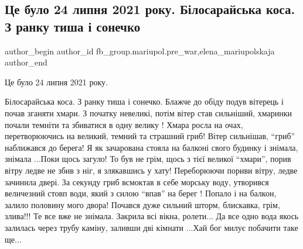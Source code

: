  
 
 
 
 

\subsection{Це було 24 липня 2021 року. Білосарайська коса. З ранку тиша і сонечко}
\label{sec:28_01_2023.fb.fb_group.mariupol.pre_war.3.tse_bulo_24_lipnya_2}
 
\ifcmt
 author_begin
   author_id fb_group.mariupol.pre_war,elena_mariupolskaja
 author_end
\fi

Це було 24 липня 2021 року.

Білосарайська коса. З ранку тиша і сонечко. Блажче до обіду подув вітерець і
почав зганяти хмари. З початку невеликі, потім вітер став сильніший, хмаринки
почали темніти та збиватися в одну велику ! Хмара росла на очах, перетворюючись
на великий, темний та страшний гриб! Вітер сильнішав, \enquote{гриб} наближався до
берега! Я як зачарована стояла на балконі свого будинку і знімала, знімала
...Поки щось загуло! То був не грім, щось з тієї великої \enquote{хмари}, порив вітру
ледве не збив з ніг, я злякавшись у хату! Переборюючи пориви вітру, ледве
зачинила двері. За секунду гриб всмоктав в себе морську воду, утворився
величезний стовп води, який з силою \enquote{впав} на берег ! Попало і на балкон,
залило половину мого двора! Почався дуже сильний шторм, блискавка, грім,
злива!!! Те все вже не знімала. Закрила всі вікна, ролети... Да все одно вода
якось залилась через трубу каміну, заливши дві кімнати ...Хай бог милує
побачити таке ще...

